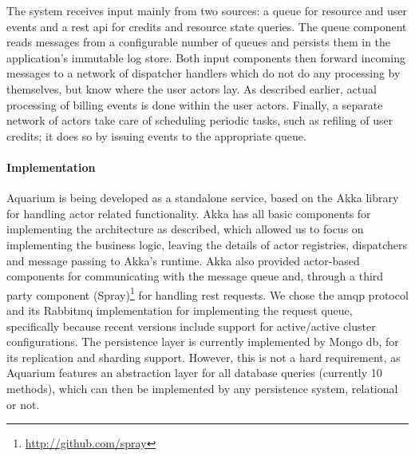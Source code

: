 The system receives input mainly from two sources: a queue for resource and
user events and a {\sc rest api} for credits and resource state queries. The queue component
reads messages from a configurable number of queues and persists them in the
application's immutable log store. Both input components then forward incoming
messages to a network of dispatcher handlers which do not do any processing by
themselves, but know where the user actors lay. As described earlier, actual
processing of billing events is done within the user actors. Finally, a
separate network of actors take care of scheduling periodic tasks, such as
refiling of user credits; it does so by issuing events to the appropriate
queue.

\paragraph{Implementation}

Aquarium is being developed as a standalone service, based on the Akka library
for handling actor related functionality. Akka has all basic components for
implementing the architecture as described, which allowed us to focus on
implementing the business logic, leaving the details of actor registries,
dispatchers and message passing to Akka's runtime. Akka also provided
actor-based components for communicating with the message queue and, through a
third party component (Spray)\footnote{\url{http://github.com/spray}} for
handling {\sc rest} requests.  We chose the {\sc amqp} protocol and its
Rabbit{\sc mq} implementation for implementing the request queue, specifically
because recent versions include support for active/active cluster
configurations. The persistence layer is currently implemented by Mongo{\sc
db}, for its replication and sharding support.  However, this is not a hard
requirement, as Aquarium features an abstraction layer for all database queries
(currently 10 methods), which can then be implemented by any persistence
system, relational or not.
